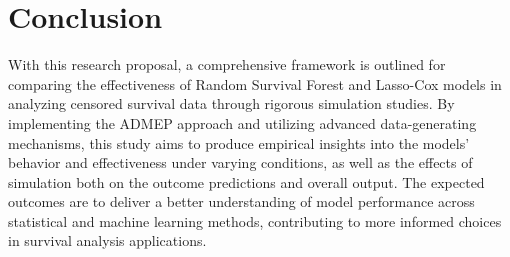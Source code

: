 \chapter{Conclusion}
\label{Chapter4}



With this research proposal, a comprehensive framework is outlined for comparing the effectiveness of Random Survival Forest and Lasso-Cox models in analyzing censored survival data through rigorous simulation studies. By implementing the ADMEP approach and utilizing advanced data-generating mechanisms, this study aims to produce empirical insights into the models' behavior and effectiveness under varying conditions, as well as the effects of simulation both on the outcome predictions and overall output. The expected outcomes are to deliver a better understanding of model performance across statistical and machine learning methods, contributing to more informed choices in survival analysis applications.